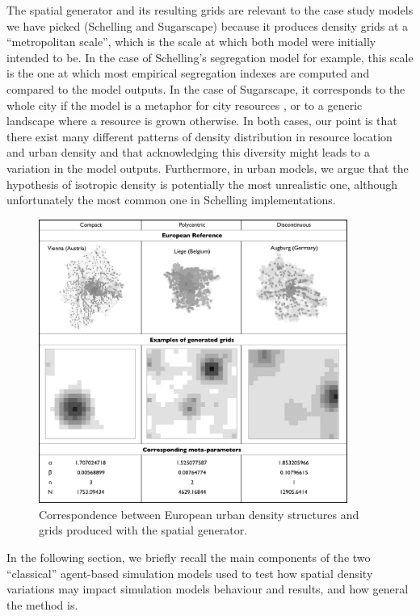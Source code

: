 \documentclass{JASSS}
\begin{document}
The spatial generator and its resulting grids are relevant to the case study models we have picked (Schelling and Sugarscape) because it produces density grids at a ``metropolitan scale'', which is the scale at which both model were initially intended to be. In the case of Schelling's segregation model for example, this scale is the one at which most empirical segregation indexes are computed and compared to the model outputs. In the case of Sugarscape, it corresponds to the whole city if the model is a metaphor for city resources \citep{batty2005agents}, or to a generic landscape where a resource is grown otherwise. In both cases, our point is that there exist many different patterns of density distribution in resource location and urban density and that acknowledging this diversity might leads to a variation in the model outputs. Furthermore, in urban models, we argue that the hypothesis of isotropic density is potentially the most unrealistic one, although unfortunately the most common one in Schelling implementations.

\begin{figure}[!t]
\centering
	\includegraphics[width=0.9\textwidth]{figures/Fig3.png}
 \caption{Correspondence between European urban density structures and grids produced with the spatial generator.} 
\label{fig:densityTypes}
\end{figure} %

In the following section, we briefly recall the main components of the two ``classical'' agent-based simulation models used to test how spatial density variations may impact simulation models behaviour and results, and how general the method is.
\end{document}
